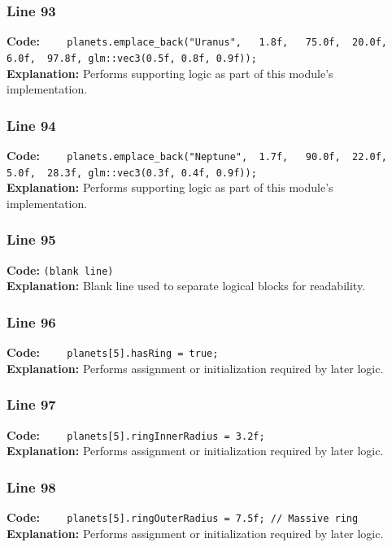 \documentclass[11pt,a4paper]{article}
\begin{document}
\subsubsection*{Line 93}
\textbf{Code:} \verb|    planets.emplace_back("Uranus",   1.8f,   75.0f,  20.0f,   6.0f,  97.8f, glm::vec3(0.5f, 0.8f, 0.9f));|\\
\textbf{Explanation:} Performs supporting logic as part of this module's implementation.

\subsubsection*{Line 94}
\textbf{Code:} \verb|    planets.emplace_back("Neptune",  1.7f,   90.0f,  22.0f,   5.0f,  28.3f, glm::vec3(0.3f, 0.4f, 0.9f));|\\
\textbf{Explanation:} Performs supporting logic as part of this module's implementation.

\subsubsection*{Line 95}
\textbf{Code:} \texttt{(blank line)}\\
\textbf{Explanation:} Blank line used to separate logical blocks for readability.

\subsubsection*{Line 96}
\textbf{Code:} \verb|    planets[5].hasRing = true;|\\
\textbf{Explanation:} Performs assignment or initialization required by later logic.

\subsubsection*{Line 97}
\textbf{Code:} \verb|    planets[5].ringInnerRadius = 3.2f;|\\
\textbf{Explanation:} Performs assignment or initialization required by later logic.

\subsubsection*{Line 98}
\textbf{Code:} \verb|    planets[5].ringOuterRadius = 7.5f; // Massive ring|\\
\textbf{Explanation:} Performs assignment or initialization required by later logic.
\end{document}

